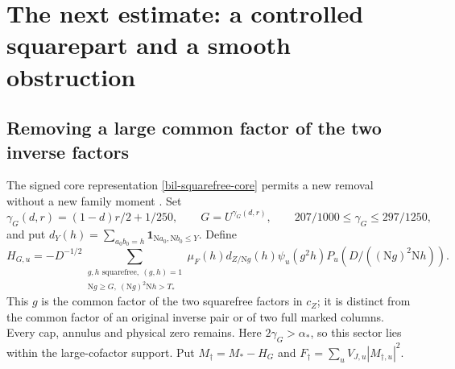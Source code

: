 \documentclass[11pt]{article}
\theoremstyle{definition}
\newcommand{\N}{\mathrm N}
\newcommand{\Id}{\mathbf 1}
\begin{document}
\section{The next estimate: a controlled squarepart and a smooth obstruction}
\label{sq-sec-estimate}

\subsection{Removing a large common factor of the two inverse factors}
The signed core representation \eqref{bil-squarefree-core} permits a
new removal without a new family moment \cite{n25}. Set
\begin{equation}\label{sq-common-cut}
 \gamma_G(d,r)=(1-d)r/2+1/250,\qquad G=U^{\gamma_G(d,r)},
 \qquad 207/1000\le\gamma_G\le297/1250,
\end{equation}
and put $d_Y(h)=\sum_{a_0b_0=h}\Id_{\N a_0,\N b_0\le Y}$. Define
\begin{equation}\label{sq-large-amplitude}
 H_{G,u}=-D^{-1/2}
 \sum_{\substack{g,h\text{ squarefree},\ (g,h)=1\\
                 \N g\ge G,\ (\N g)^2\N h>T_*}}
 \mu_F(h)d_{Z/\N g}(h)\psi_u(g^2h)P_u(D/((\N g)^2\N h)).
\end{equation}
This $g$ is the common factor of the two squarefree factors in $c_Z$;
it is distinct from the common factor of an original inverse pair or
of two full marked columns. Every cap, annulus and physical zero remains.
Here $2\gamma_G>\alpha_*$, so this sector lies within the large-cofactor
support. Put $M_\dagger=M_*-H_G$ and
$F_\dagger=\sum_uV_{J,u}|M_{\dagger,u}|^2$.
\end{document}
